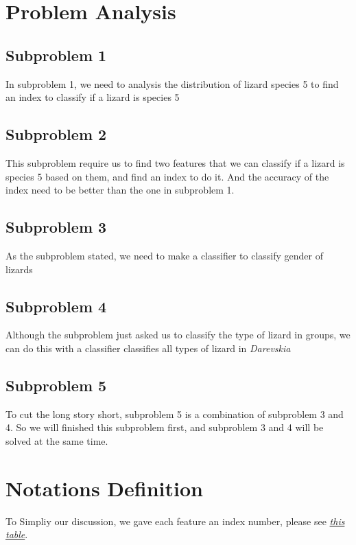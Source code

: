 \documentclass[12pt]{article}
\begin{document}
\section{Problem Analysis}
	\subsection{Subproblem 1}
		In subproblem 1, we need to analysis the distribution of
		lizard species 5 to find an index to classify if a lizard
		is species 5
	\subsection{Subproblem 2}
		This subproblem require us to find two features that we
		can classify if a lizard is species 5 based on them, and
		find an index to do it. And the accuracy of the index need
		to be better than the one in subproblem 1.
	\subsection{Subproblem 3}
		As the subproblem stated, we need to make a classifier to
		classify gender of lizards
		
	\subsection{Subproblem 4}
		Although the subproblem just asked us to classify the type
		of lizard in groups, we can do this with a classifier classifies
		all types of lizard in \textit{Darevskia}
	
	\subsection{Subproblem 5}
		To cut the long story short, subproblem 5 is a combination of
		subproblem 3 and 4. So we will finished this subproblem first,
		and subproblem 3 and 4 will be solved at the same time.
	
\section{Notations Definition}
	
	To Simpliy our discussion, we gave each feature an index number, please see
	\textit{\hyperlink{tab:feature}{this table}}.
	
\end{document}
